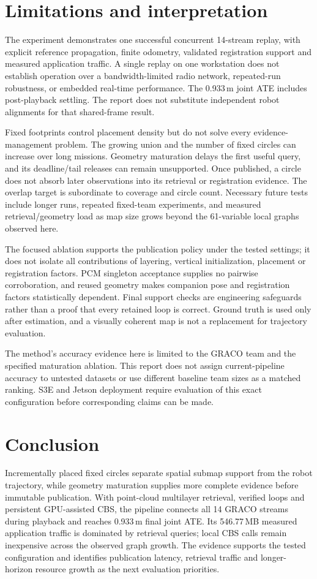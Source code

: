 \section{Limitations and interpretation}
The experiment demonstrates one successful concurrent 14-stream replay, with explicit reference propagation, finite odometry, validated registration support and measured application traffic. A single replay on one workstation does not establish operation over a bandwidth-limited radio network, repeated-run robustness, or embedded real-time performance. The 0.933\,m joint ATE includes post-playback settling. The report does not substitute independent robot alignments for that shared-frame result.

Fixed footprints control placement density but do not solve every evidence-management problem. The growing union and the number of fixed circles can increase over long missions. Geometry maturation delays the first useful query, and its deadline/tail releases can remain unsupported. Once published, a circle does not absorb later observations into its retrieval or registration evidence. The overlap target is subordinate to coverage and circle count. Necessary future tests include longer runs, repeated fixed-team experiments, and measured retrieval/geometry load as map size grows beyond the 61-variable local graphs observed here.

The focused ablation supports the publication policy under the tested settings; it does not isolate all contributions of layering, vertical initialization, placement or registration factors. PCM singleton acceptance supplies no pairwise corroboration, and reused geometry makes companion pose and registration factors statistically dependent. Final support checks are engineering safeguards rather than a proof that every retained loop is correct. Ground truth is used only after estimation, and a visually coherent map is not a replacement for trajectory evaluation.

The method's accuracy evidence here is limited to the GRACO team and the specified maturation ablation. This report does not assign current-pipeline accuracy to untested datasets or use different baseline team sizes as a matched ranking. S3E and Jetson deployment require evaluation of this exact configuration before corresponding claims can be made.

\section{Conclusion}
Incrementally placed fixed circles separate spatial submap support from the robot trajectory, while geometry maturation supplies more complete evidence before immutable publication. With point-cloud multilayer retrieval, verified loops and persistent GPU-assisted CBS, the pipeline connects all 14 GRACO streams during playback and reaches 0.933\,m final joint ATE. Its 546.77\,MB measured application traffic is dominated by retrieval queries; local CBS calls remain inexpensive across the observed graph growth. The evidence supports the tested configuration and identifies publication latency, retrieval traffic and longer-horizon resource growth as the next evaluation priorities.
